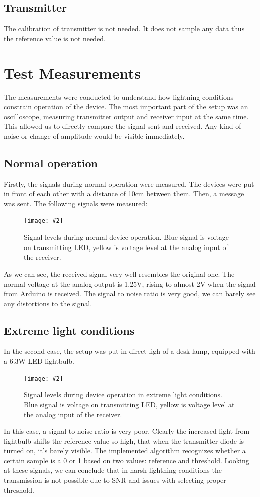 \documentclass[12pt]{article}
\newcommand{\image}[3]{
\begin{figure}[h]
	\begin{center}
		\texttt{[image: \#2]}
	\end{center}
  \caption{#1}
\end{figure}}
\begin{document}
  \subsection{Transmitter}
  The calibration of transmitter is not needed. It does not sample any data thus the reference value is not needed.
	
	\section{Test Measurements}
  The measurements were conducted to understand how lightning conditions constrain operation of the device. The most important part of the setup was 
  an oscilloscope, measuring transmitter output and receiver input at the same time. This allowed us to directly compare the signal sent and received.
  Any kind of noise or change of amplitude would be visible immediately.

  \subsection{Normal operation}
  Firstly, the signals during normal operation were measured. The devices were put in front of each other with a distance of 10cm between them.
  Then, a message was sent. The following signals were measured:
  \image{Signal levels during normal device operation. Blue signal is voltage on transmitting LED, yellow is voltage level at the analog input of the receiver.}{normal.png}{0.5}
  As we can see, the received signal very well resembles the original one. The normal voltage at the analog output is 1.25V, rising to almost 2V when the signal from Arduino is received.
  The signal to noise ratio is very good, we can barely see any distortions to the signal.

  
  \newpage
  \subsection{Extreme light conditions}
  In the second case, the setup was put in direct ligh of a desk lamp, equipped with a 6.3W LED lightbulb.
  \image{Signal levels during device operation in extreme light conditions. Blue signal is voltage on transmitting LED, yellow is voltage level at the analog input of the receiver.}{noise.png}{0.5}
  In this case, a signal to noise ratio is very poor. Clearly the increased light from lightbulb shifts the reference value so high, that 
  when the transmitter diode is turned on, it's barely visible.
  The implemented algorithm recognizes whether a certain sample is a 0 or 1 based on two values: reference and threshold.
  Looking at these signals, we can conclude that in harsh lightning conditions the transmission is not possible due to SNR and issues with selecting proper threshold.
\end{document}
